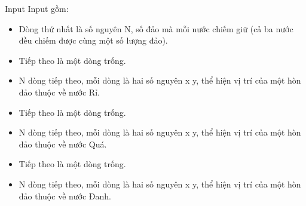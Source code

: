 Input  
Input gồm:  
\begin{itemize}
	\item     Dòng thứ nhất là số nguyên N, số đảo mà mỗi nước chiếm giữ (cả ba nước đều chiếm được cùng một số lượng đảo).   
	\item     Tiếp theo là một dòng trống.   
	\item     N dòng tiếp theo, mỗi dòng là hai số nguyên x y, thể hiện vị trí của một hòn đảo thuộc về nước Rỉ.   
	\item     Tiếp theo là một dòng trống.   
	\item     N dòng tiếp theo, mỗi dòng là hai số nguyên x y, thể hiện vị trí của một hòn đảo thuộc về nước Quá.   
	\item     Tiếp theo là một dòng trống.   
	\item     N dòng tiếp theo, mỗi dòng là hai số nguyên x y, thể hiện vị trí của một hòn đảo thuộc về nước Đanh.   
\end{itemize}